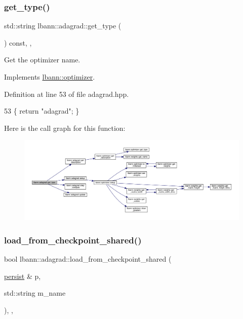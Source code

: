 \subsubsection{\texorpdfstring{get\+\_\+type()}{get\_type()}}
{\footnotesize\ttfamily std\+::string lbann\+::adagrad\+::get\+\_\+type (\begin{DoxyParamCaption}{ }\end{DoxyParamCaption}) const\hspace{0.3cm}{\ttfamily [inline]}, {\ttfamily [override]}, {\ttfamily [virtual]}}

Get the optimizer name. 

Implements \hyperlink{classlbann_1_1optimizer_a7b7a6814e14eeee157e1cbb7f15dd4ff}{lbann\+::optimizer}.



Definition at line 53 of file adagrad.\+hpp.


\begin{DoxyCode}
53 \{ \textcolor{keywordflow}{return} \textcolor{stringliteral}{"adagrad"}; \}
\end{DoxyCode}
Here is the call graph for this function\+:\nopagebreak
\begin{figure}[H]
\begin{center}
\leavevmode
\includegraphics[width=350pt]{classlbann_1_1adagrad_a7a287b367af6ef6f7f21141ad78732a7_cgraph}
\end{center}
\end{figure}
\mbox{\label{classlbann_1_1adagrad_ac6b6eb0c4d393679f69281c072dbc4fa}} 
\subsubsection{\texorpdfstring{load\+\_\+from\+\_\+checkpoint\+\_\+shared()}{load\_from\_checkpoint\_shared()}}
{\footnotesize\ttfamily bool lbann\+::adagrad\+::load\+\_\+from\+\_\+checkpoint\+\_\+shared (\begin{DoxyParamCaption}\item[{\hyperlink{classlbann_1_1persist}{persist} \&}]{p,  }\item[{std\+::string}]{m\+\_\+name }\end{DoxyParamCaption})\hspace{0.3cm}{\ttfamily [override]}, {\ttfamily [private]}, {\ttfamily [virtual]}}



